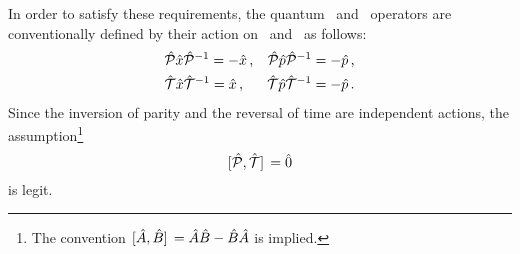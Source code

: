         In order to satisfy these requirements, the quantum \hP\ and \hT\ operators are conventionally defined by their action on \hx\ and \hp\ as follows:
        \begin{align}
            \label{eq:quantum-P}
            &\mathcal{\hat{P}}\hat{x}\mathcal{\hat{P}}^{-1} = -\hat{x}
            \,\text{,}
            &\mathcal{\hat{P}}\hat{p}\mathcal{\hat{P}}^{-1} = -\hat{p}
            \,\text{,}
            \\
            \label{eq:quantum-T}
            &\mathcal{\hat{T}}\hat{x}\mathcal{\hat{T}}^{-1} = \hat{x}
            \,\text{,}
            &\mathcal{\hat{T}}\hat{p}\mathcal{\hat{T}}^{-1} = -\hat{p}
            \,\text{.}
        \end{align}
        Since the inversion of parity and the reversal of time are independent actions, the assumption\footnote{The convention $\comm*{\hA}{\togglehat{B}} = \hA\togglehat{B} - \togglehat{B}\hA$ is implied.}
        \begin{equation}
            \label{eq:PT-commutator}
            \comm*{\hP}{\hT} = \hzero 
        \end{equation}
        is legit.

